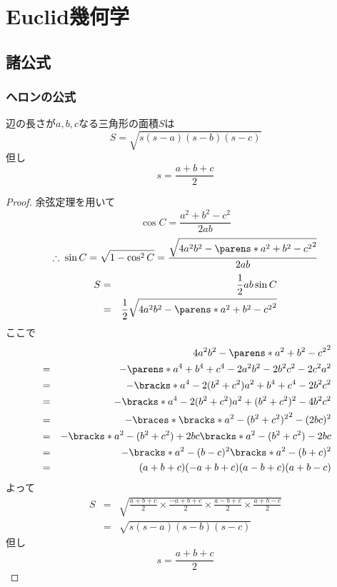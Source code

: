 \chapter{Euclid幾何学}
    \section{諸公式}
        \subsection{ヘロンの公式}
            \begin{shadebox}
                辺の長さが$a,b,c$なる三角形の面積$S$は
                \[S = \sqrt{s(s-a)(s-b)(s-c)}\]
                但し
                \[s = \frac{a+b+c}{2}\]
            \end{shadebox}
            \begin{proof}
                余弦定理を用いて
                \[\cos{C} = \frac{a^2+b^2-c^2}{2ab}\]
                \[\therefore \; \sin{C} = \sqrt{1-\cos^2{C}} = \frac{\sqrt{4a^2b^2-{\parens*{a^2+b^2-c^2}}^2}}{2ab}\]
                \begin{align*}
                    S &=& \frac{1}{2}ab\sin{C}\\
                    &=& \frac{1}{2}\sqrt{4a^2b^2-{\parens*{a^2+b^2-c^2}}^2}
                \end{align*}
                ここで
                \begin{align*}
                    &\;& 4a^2b^2-{\parens*{a^2+b^2-c^2}}^2\\
                    &=& -\parens*{a^4+b^4+c^4-2a^2b^2-2b^2c^2-2c^2a^2}\\
                    &=& -\bracks*{a^4 - 2(b^2+c^2)a^2 + b^4+c^4 -2b^2c^2}\\
                    &=& -\bracks*{a^4 - 2(b^2+c^2)a^2 + (b^2+c^2)^2 -4b^2c^2}\\
                    &=& -\braces*{\bracks*{a^2-(b^2+c^2)^2}^2-(2bc)^2}\\
                    &=& -\bracks*{a^2-(b^2+c^2)+2bc}\bracks*{a^2-(b^2+c^2)-2bc}\\
                    &=& -\bracks*{a^2-(b-c)^2}\bracks*{a^2-(b+c)^2}\\
                    &=& (a+b+c)(-a+b+c)(a-b+c)(a+b-c)
                \end{align*}
                よって
                \begin{align*}
                    S &=& \sqrt{\frac{a+b+c}{2}\times\frac{-a+b+c}{2}\times\frac{a-b+c}{2}\times\frac{a+b-c}{2}}\\
                    &=& \sqrt{s(s-a)(s-b)(s-c)}
                \end{align*}
                但し
                \[s = \frac{a+b+c}{2}\]
            \end{proof}
